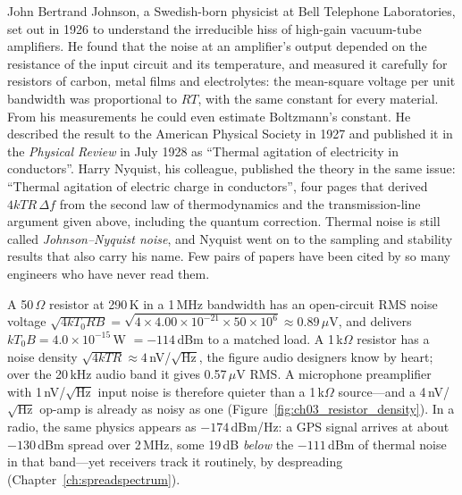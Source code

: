 
\begin{history}
John Bertrand Johnson, a Swedish-born physicist at Bell Telephone Laboratories, set out in 1926 to
understand the irreducible hiss of high-gain vacuum-tube amplifiers. He found that the noise at an
amplifier's output depended on the resistance of the input circuit and its temperature, and measured it
carefully for resistors of carbon, metal films and electrolytes: the mean-square voltage per unit
bandwidth was proportional to $RT$, with the same constant for every material. From his measurements
he could even estimate Boltzmann's constant. He described the result to the American Physical Society
in 1927 and published it in the \emph{Physical Review} in July 1928 as ``Thermal agitation of
electricity in conductors''. Harry Nyquist, his colleague, published the theory in the same issue:
``Thermal agitation of electric charge in conductors'', four pages that derived $4kTR\,\Delta f$ from the
second law of thermodynamics and the transmission-line argument given above, including the quantum
correction. Thermal noise is still called \emph{Johnson--Nyquist noise}, and Nyquist went on to the
sampling and stability results that also carry his name. Few pairs of papers have been cited by so many
engineers who have never read them.
\end{history}

\begin{worked}
A 50\,$\Omega$ resistor at 290\,K in a 1\,MHz bandwidth has an open-circuit RMS noise voltage
$\sqrt{4kT_0RB}=\sqrt{4\times4.00\times10^{-21}\times50\times10^6}\approx0.89\,\mu$V, and delivers
$kT_0B=4.0\times10^{-15}$\,W $=-114$\,dBm to a matched load. A 1\,k$\Omega$ resistor has a noise density
$\sqrt{4kTR}\approx4$\,nV/$\sqrt{\text{Hz}}$, the figure audio designers know by heart; over the 20\,kHz
audio band it gives 0.57\,$\mu$V RMS. A microphone preamplifier with 1\,nV/$\sqrt{\text{Hz}}$ input
noise is therefore quieter than a 1\,k$\Omega$ source---and a 4\,nV/$\sqrt{\text{Hz}}$ op-amp is already
as noisy as one (Figure~\ref{fig:ch03_resistor_density}). In a radio, the same physics appears as
$-174$\,dBm/Hz: a GPS signal arrives at about $-130$\,dBm spread over 2\,MHz, some 19\,dB \emph{below}
the $-111$\,dBm of thermal noise in that band---yet receivers track it routinely, by despreading
(Chapter~\ref{ch:spreadspectrum}).
\end{worked}

